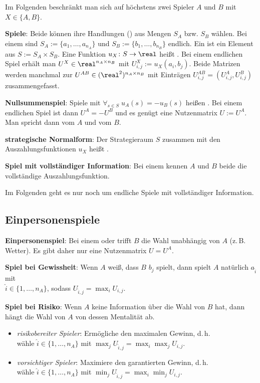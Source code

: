 Im Folgenden beschränkt man sich auf höchstens zwei Spieler $A$ und $B$
mit $X \in \{A, B\}$.

\textbf{Spiele}:
Beide können ihre Handlungen () aus Mengen $S_A$ bzw. $S_B$ wählen.
Bei einem  sind $S_A := \{a_1, \dotsc, a_{n_A}\}$ und
$S_B := \{b_1, \dotsc, b_{n_B}\}$ endlich.
Ein  ist ein Element aus $S := S_A \times S_B$.
Eine Funktion $u_X\colon S \to \real$ heißt .
Bei einem endlichen Spiel erhält man 
$U^X \in \real^{n_A \times n_B}$ mit
$U_{i,j}^X := u_X(a_i, b_j)$.
Beide Matrizen werden manchmal zur 
$U^{AB} \in (\real^2)^{n_A \times n_B}$ mit Einträgen $U_{i,j}^{AB} = (U_{i,j}^A, U_{i,j}^B)$
zusammengefasst.

\textbf{Nullsummenspiel}:
Spiele mit $\forall_{s \in S}\; u_A(s) = -u_B(s)$ heißen .
Bei einem endlichen Spiel ist dann $U^A = -U^B$ und es genügt eine Nutzenmatrix $U := U^A$.
Man spricht dann vom  $A$ und vom  $B$.

\textbf{strategische Normalform}:
Der Strategieraum $S$ zusammen mit den Auszahlungsfunktionen $u_X$ heißt
.

\textbf{Spiel mit vollständiger Information}:
Bei einem  kennen $A$ und $B$ beide die
vollständige Auszahlungsfunktion.

Im Folgenden geht es nur noch um endliche Spiele mit vollständiger Information.

\pagebreak

\subsection{%
    Einpersonenspiele%
}

\textbf{Einpersonenspiel}:
Bei einem  oder  trifft
$B$ die Wahl unabhängig von $A$ (z.\,B. Wetter).
Es gibt daher nur eine Nutzenmatrix $U = U^A$.

\textbf{Spiel bei Gewissheit}:
Wenn $A$ weiß, dass $B$ $b_j$ spielt, dann spielt $A$ natürlich $a_{\widehat{i}}$ mit\\
$\widehat{i} \in \{1, \dotsc, n_A\}$, sodass $U_{\widehat{i},j} = \max_i U_{i,j}$.

\textbf{Spiel bei Risiko}:
Wenn $A$ keine Information über die Wahl von $B$ hat, dann hängt die Wahl von $A$ von dessen
Mentalität ab.
\begin{itemize}
    \item
    \emph{risikobereiter Spieler}:
    Ermögliche den maximalen Gewinn, d.\,h.\\
    wähle $\widehat{i} \in \{1, \dotsc, n_A\}$
    mit $\max_j U_{\widehat{i},j} = \max_i \max_j U_{i,j}$.

    \item
    \emph{vorsichtiger Spieler}:
    Maximiere den garantierten Gewinn, d.\,h.\\
    wähle $\widehat{i} \in \{1, \dotsc, n_A\}$
    mit $\min_j U_{\widehat{i},j} = \max_i \min_j U_{i,j}$.
\end{itemize}

